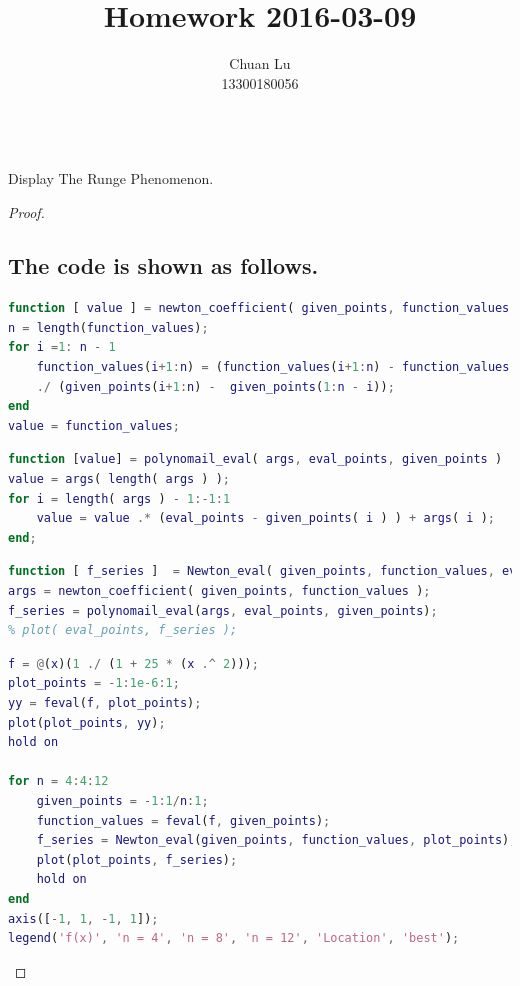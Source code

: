\documentclass[48pt]{article}
\newenvironment{problem}[2][Problem]{\begin{trivlist}
\item[\hskip \labelsep {\bfseries #1}\hskip \labelsep {\bfseries #2.}]}{\end{trivlist}}
\begin{document}
\title{Homework 2016-03-09}
\author{Chuan Lu\\
13300180056}

\maketitle

\begin{problem}{1}
\text{ }\\
Display The Runge Phenomenon.
\end{problem}

\begin{proof}
\subsection{The code is shown as follows.}
\begin{lstlisting}[language={MATLAB}]
function [ value ] = newton_coefficient( given_points, function_values )
n = length(function_values);
for i =1: n - 1
    function_values(i+1:n) = (function_values(i+1:n) - function_values(i:n - 1))
    ./ (given_points(i+1:n) -  given_points(1:n - i));
end
value = function_values;
\end{lstlisting}

\begin{lstlisting}[language={MATLAB}]
function [value] = polynomail_eval( args, eval_points, given_points )
value = args( length( args ) );
for i = length( args ) - 1:-1:1
    value = value .* (eval_points - given_points( i ) ) + args( i );
end;
\end{lstlisting}

\begin{lstlisting}[language = {MATLAB}]
function [ f_series ]  = Newton_eval( given_points, function_values, eval_points)
args = newton_coefficient( given_points, function_values );
f_series = polynomail_eval(args, eval_points, given_points);
% plot( eval_points, f_series );
\end{lstlisting}

\begin{lstlisting}[language = {MATLAB}]
f = @(x)(1 ./ (1 + 25 * (x .^ 2)));
plot_points = -1:1e-6:1;
yy = feval(f, plot_points);
plot(plot_points, yy);
hold on

for n = 4:4:12
    given_points = -1:1/n:1;
    function_values = feval(f, given_points);
    f_series = Newton_eval(given_points, function_values, plot_points);
    plot(plot_points, f_series);
    hold on
end
axis([-1, 1, -1, 1]);
legend('f(x)', 'n = 4', 'n = 8', 'n = 12', 'Location', 'best');
\end{lstlisting}


\end{proof}
\end{document}
